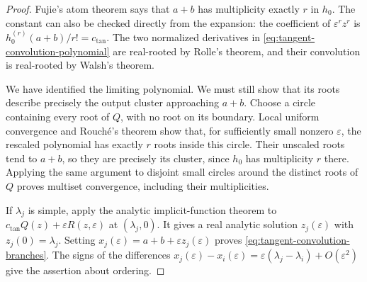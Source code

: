 \documentclass[10pt,a4paper]{amsart}
\newcommand{\eps}{\varepsilon}
\begin{document}
\begin{proof}
Fujie's atom theorem says that \(a+b\) has multiplicity exactly \(r\)
in \(h_0\).  The constant can also be checked directly from the
expansion: the coefficient of \(\eps^rz^r\) is
\(h_0^{(r)}(a+b)/r!=c_{\mathrm{tan}}\). The two normalized derivatives in
\eqref{eq:tangent-convolution-polynomial} are real-rooted by Rolle's
theorem, and their convolution is real-rooted by Walsh's theorem.

We have identified the limiting polynomial. We must still show that its roots describe precisely the output cluster approaching \(a+b\).  Choose a circle containing every root of \(Q\), with no root on its boundary. Local uniform convergence and Rouch\'e's theorem show that,
for sufficiently small nonzero \(\eps\), the rescaled polynomial
has exactly \(r\) roots inside this circle.  Their unscaled roots tend
to \(a+b\), so they are precisely its cluster, since \(h_0\) has
multiplicity \(r\) there.  Applying the same argument to disjoint
small circles around the distinct roots of \(Q\) proves multiset
convergence, including their multiplicities.

If \(\lambda_j\) is simple, apply the analytic implicit-function
theorem to \(c_{\mathrm{tan}}Q(z)+\eps R(z,\eps)\) at \((\lambda_j,0)\).
It gives a real analytic solution \(z_j(\eps)\) with
\(z_j(0)=\lambda_j\).  Setting
\(x_j(\eps)=a+b+\eps z_j(\eps)\) proves
\eqref{eq:tangent-convolution-branches}.  The signs of the differences
\(x_j(\eps)-x_i(\eps)=\eps(\lambda_j-\lambda_i)+O(\eps^2)\)
give the assertion about ordering.
\end{proof}
\end{document}
